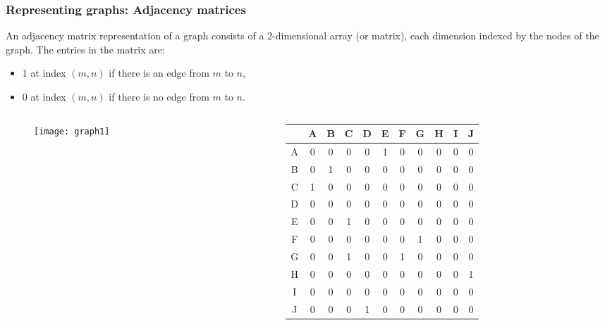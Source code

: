    \begin{frame}[fragile]
\frametitle{Representing graphs: Adjacency matrices}

An \color{blue}adjacency matrix \color{black} representation of a graph consists of a 2-dimensional array (or matrix), each dimension indexed by the nodes of the graph. The entries in the matrix are:
\begin{itemize}
\item \color{red}1 \color{black} at index $(m,n)$ if there is an edge from $m$ to $n$,
\item \color{red}0 \color{black} at index $(m,n)$ if there is no edge from $m$ to $n$.
\end{itemize}

\end{frame}

   \begin{frame}[fragile]

  \begin{columns}
    \begin{column}{0.4\linewidth}
    

    \begin{figure} [ht]
    \centering
    \texttt{[image: graph1]}
    \end{figure}
	\end{column}
	    \begin{column}{0.6\linewidth}

{\scriptsize
   \begin{figure} [ht]
\begin{center}
\begin{tabular}{c|cccccccccc}
  & A & B & C & D & E & F & G & H & I & J \\
\hline 
A & 0 & 0 & 0 & 0 & 1 & 0 & 0 & 0 & 0 & 0 \\
B & 0 & 1 & 0 & 0 & 0 & 0 & 0 & 0 & 0 & 0 \\
C & 1 & 0 & 0 & 0 & 0 & 0 & 0 & 0 & 0 & 0 \\
D & 0 & 0 & 0 & 0 & 0 & 0 & 0 & 0 & 0 & 0 \\
E & 0 & 0 & 1 & 0 & 0 & 0 & 0 & 0 & 0 & 0 \\
F & 0 & 0 & 0 & 0 & 0 & 0 & 1 & 0 & 0 & 0 \\ 
G & 0 & 0 & 1 & 0 & 0 & 1 & 0 & 0 & 0 & 0 \\ 
H & 0 & 0 & 0 & 0 & 0 & 0 & 0 & 0 & 0 & 1 \\
I & 0 & 0 & 0 & 0 & 0 & 0 & 0 & 0 & 0 & 0 \\ 
J & 0 & 0 & 0 & 1 & 0 & 0 & 0 & 0 & 0 & 0   
\end{tabular}
\end{center}
    \end{figure}
}
	\end{column}
  \end{columns}
\end{frame}


